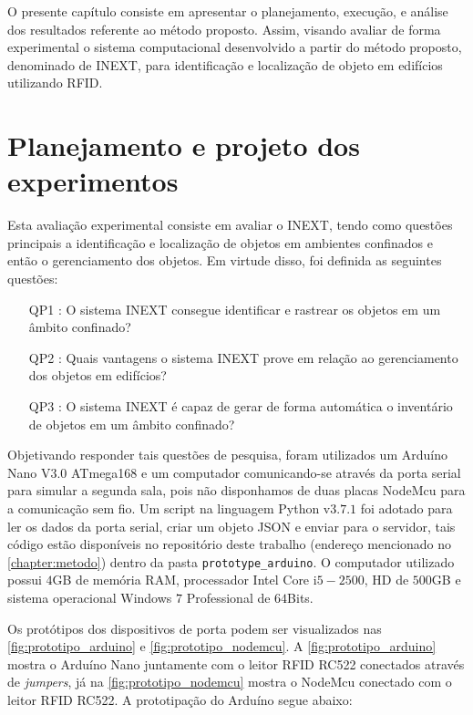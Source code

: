 \label{chapter:resultados}

O presente capítulo consiste em apresentar o planejamento, execução, e  análise dos resultados referente ao método proposto. Assim,  visando avaliar de forma experimental o sistema computacional desenvolvido a partir do método proposto, denominado de INEXT, para identificação e localização de objeto em edifícios utilizando RFID.

\section{Planejamento e projeto dos experimentos}

Esta avaliação experimental consiste em avaliar o INEXT, tendo como questões principais a identificação e localização de objetos em ambientes confinados e então o gerenciamento dos objetos. Em virtude disso, foi definida as seguintes questões:

\begin{itemize}

    \item[QP1]: O sistema INEXT consegue identificar e rastrear os objetos em um âmbito confinado?
    \item[QP2]: Quais vantagens o sistema INEXT prove em relação ao gerenciamento dos objetos em edifícios?
    \item[QP3]: O sistema INEXT é capaz de gerar de forma automática o inventário de objetos em um âmbito confinado?
    
\end{itemize}

\par 
Objetivando responder tais questões de pesquisa, foram utilizados um Arduíno Nano V$3.0$ ATmega168 e um computador comunicando-se através da porta serial para simular a segunda sala, pois não disponhamos de duas placas NodeMcu para a comunicação sem fio. Um script na linguagem Python v$3.7.1$ foi adotado para ler os dados da porta serial, criar um objeto JSON e enviar para o servidor, tais código estão disponíveis no repositório deste trabalho (endereço mencionado no \autoref{chapter:metodo}) dentro da pasta \texttt{prototype\_arduino}. O computador utilizado possui $4$GB de memória RAM, processador Intel Core i$5-2500$, HD de $500$GB e sistema operacional Windows $7$ Professional de $64$Bits. 

Os protótipos dos dispositivos de porta podem ser visualizados nas \autoref{fig:prototipo_arduino} e \autoref{fig:prototipo_nodemcu}. A \autoref{fig:prototipo_arduino} mostra o Arduíno Nano juntamente com o leitor RFID RC522 conectados através de \textit{jumpers}, já na \autoref{fig:prototipo_nodemcu} mostra o NodeMcu conectado com o leitor RFID RC522. A prototipação do Arduíno segue abaixo:

